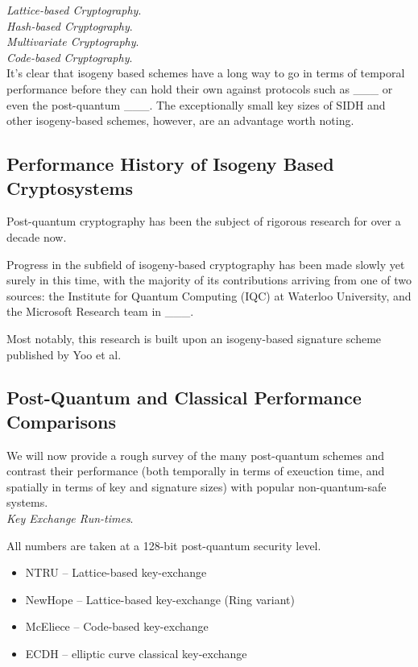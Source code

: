\noindent
\textit{Lattice-based Cryptography}.\\

\noindent
\textit{Hash-based Cryptography}.\\

\noindent
\textit{Multivariate Cryptography}.\\

\noindent
\textit{Code-based Cryptography}.\\


It's clear that isogeny based schemes have a long way to go in terms of temporal performance before they can hold their own against protocols such as \_\_\_ or even the post-quantum \_\_\_. The exceptionally small key sizes of SIDH and other isogeny-based schemes, however, are an advantage worth noting. 


\subsection{Performance History of Isogeny Based Cryptosystems}

Post-quantum cryptography has been the subject of rigorous research for over a decade now. 

Progress in the subfield of isogeny-based cryptography has been made slowly yet surely in this time, with the majority of its contributions arriving from one of two sources: the Institute for Quantum Computing (IQC) at Waterloo University, and the Microsoft Research team in \_\_\_. 

Most notably, this research is built upon an isogeny-based signature scheme published by Yoo et al. 

\subsection{Post-Quantum and Classical Performance Comparisons}

We will now provide a rough survey of the many post-quantum schemes and contrast their performance (both temporally in terms of exeuction time, and spatially in terms of key and signature sizes) with popular non-quantum-safe systems.\\

\noindent
\textit{Key Exchange Run-times}.

All numbers are taken at a 128-bit post-quantum security level.

\begin{itemize}
\item NTRU -- Lattice-based key-exchange
\item NewHope -- Lattice-based key-exchange (Ring variant)
\item McEliece -- Code-based key-exchange
\item ECDH -- elliptic curve classical key-exchange
\end{itemize}

